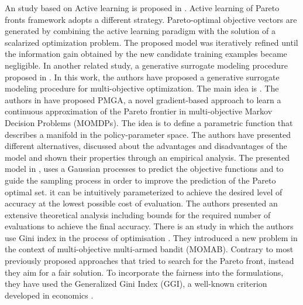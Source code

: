 An study based on Active learning is proposed in \cite{campigotto2014active}. Active learning of Pareto fronts framework adopts a different strategy. Pareto-optimal objective vectors are generated by combining the active learning paradigm with the solution of a scalarized optimization problem. The proposed model was iteratively refined until the information gain obtained by the new candidate training examples became negligible.
In another related study, a generative surrogate modeling procedure proposed in \cite{hussein2016generative}. In this work, the authors have proposed a generative surrogate modeling procedure for multi-objective optimization. The main idea is . 
The authors in \cite{pirotta2015multi} have proposed PMGA, a novel gradient-based approach to learn a continuous approximation of the Pareto frontier in 
multi-objective Markov Decision Problems (MOMDPs). The idea is to define a parametric function that describes a manifold in the policy-parameter space.
The authors have presented different alternatives, discussed about the advantages and disadvantages of the model and shown their properties through an empirical analysis.
The presented model in \cite{zuluaga2013active}, uses a Gaussian processes to predict the objective functions and to guide the sampling process in
order to improve the prediction of the Pareto optimal set. it can be intuitively parameterized to achieve the desired level of accuracy at the lowest possible cost of evaluation. The authors presented an extensive theoretical analysis including bounds for the required number of evaluations to achieve the final accuracy. 
There is an study in which the authors use Gini index in the process of optimisation \cite{busa2017multi}. They introduced a new problem in the context of multi-objective multi-armed bandit (MOMAB). Contrary to most previously proposed approaches that tried to search for the Pareto front, instead they aim for a fair solution. To incorporate the fairness into the formulations, they have used the Generalized Gini Index (GGI), a well-known criterion developed in economics \cite{busa2017multi}.

